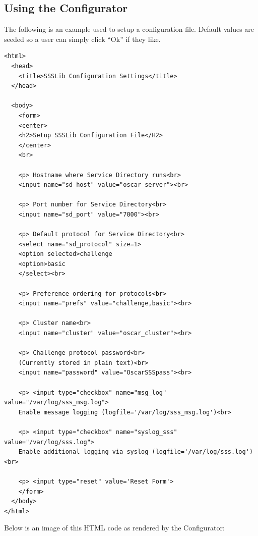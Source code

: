\subsection{Using the Configurator}
\label{sect:example-configurator}

The following is an example  used to setup a
configuration file.  Default values are seeded so a user can simply click
``Ok'' if they like.

\begin{scriptsize}
\begin{verbatim}
<html>
  <head> 
    <title>SSSLib Configuration Settings</title> 
  </head> 

  <body>
    <form>
    <center>
    <h2>Setup SSSLib Configuration File</H2>
    </center>
    <br>

    <p> Hostname where Service Directory runs<br>
    <input name="sd_host" value="oscar_server"><br>

    <p> Port number for Service Directory<br>
    <input name="sd_port" value="7000"><br>

    <p> Default protocol for Service Directory<br>
    <select name="sd_protocol" size=1>
    <option selected>challenge
    <option>basic
    </select><br>

    <p> Preference ordering for protocols<br>
    <input name="prefs" value="challenge,basic"><br>

    <p> Cluster name<br>
    <input name="cluster" value="oscar_cluster"><br>

    <p> Challenge protocol password<br>
    (Currently stored in plain text)<br>
    <input name="password" value="OscarSSSpass"><br>   

    <p> <input type="checkbox" name="msg_log" value="/var/log/sss_msg.log">
    Enable message logging (logfile='/var/log/sss_msg.log')<br>

    <p> <input type="checkbox" name="syslog_sss" value="/var/log/sss.log">   
    Enable additional logging via syslog (logfile='/var/log/sss.log')<br>

    <p> <input type="reset" value='Reset Form'>
    </form>
  </body> 
</html>
\end{verbatim}
\end{scriptsize}

Below is an image of this HTML code as rendered by the Configurator:

